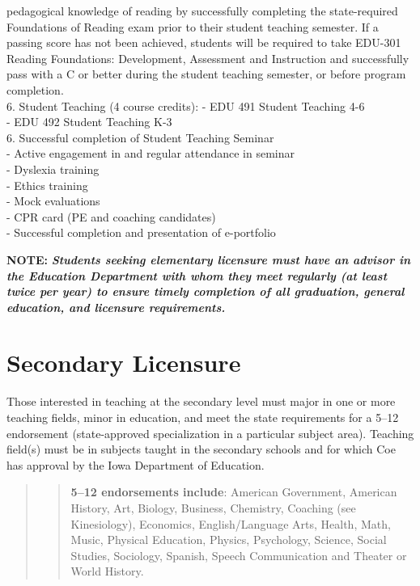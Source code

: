 \documentclass[
  letterpaper,
]{scrbook}
\begin{document}
pedagogical knowledge of reading by successfully completing the
state-required Foundations of Reading exam prior to their student
teaching semester. If a passing score has not been achieved, students
will be required to take EDU-301 Reading Foundations: Development,
Assessment and Instruction and successfully pass with a C or better
during the student teaching semester, or before program completion.\\
6. Student Teaching (4 course credits): - EDU 491 Student Teaching 4-6\\
- EDU 492 Student Teaching K-3\\
6. Successful completion of Student Teaching Seminar\\
- Active engagement in and regular attendance in seminar\\
- Dyslexia training\\
- Ethics training\\
- Mock evaluations\\
- CPR card (PE and coaching candidates)\\
- Successful completion and presentation of e-portfolio

\textbf{NOTE:} \textbf{\emph{Students seeking elementary licensure must
have an advisor in the Education Department with whom they meet
regularly (at least twice per year) to ensure timely completion of all
graduation, general education, and licensure requirements.}}

\section{Secondary Licensure}\label{secondary-licensure}

Those interested in teaching at the secondary level must major in one or
more teaching fields, minor in education, and meet the state
requirements for a 5--12 endorsement (state-approved specialization in a
particular subject area). Teaching field(s) must be in subjects taught
in the secondary schools and for which Coe has approval by the Iowa
Department of Education.

\begin{quote}
\begin{quote}
\textbf{5--12 endorsements include}: American Government, American
History, Art, Biology, Business, Chemistry, Coaching (see Kinesiology),
Economics, English/Language Arts, Health, Math, Music, Physical
Education, Physics, Psychology, Science, Social Studies, Sociology,
Spanish, Speech Communication and Theater or World History.
\end{quote}
\end{quote}
\end{document}
